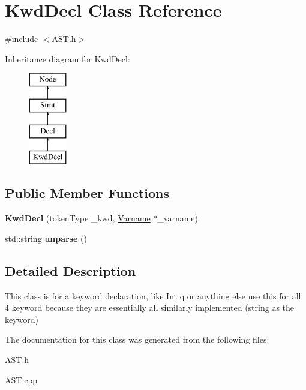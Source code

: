 \hypertarget{classKwdDecl}{\section{Kwd\-Decl Class Reference}
\label{classKwdDecl}
}


{\ttfamily \#include $<$A\-S\-T.\-h$>$}

Inheritance diagram for Kwd\-Decl\-:\begin{figure}[H]
\begin{center}
\leavevmode
\includegraphics[height=4.000000cm]{classKwdDecl}
\end{center}
\end{figure}
\subsection*{Public Member Functions}
\begin{DoxyCompactItemize}
\item 
\hypertarget{classKwdDecl_a676b9e05697b0acf311b3c57456d7304}{{\bfseries Kwd\-Decl} (token\-Type \-\_\-kwd, \hyperlink{classVarname}{Varname} $\ast$\-\_\-varname)}\label{classKwdDecl_a676b9e05697b0acf311b3c57456d7304}

\item 
\hypertarget{classKwdDecl_ac5f258785ee2a869413772b32c627973}{std\-::string {\bfseries unparse} ()}\label{classKwdDecl_ac5f258785ee2a869413772b32c627973}

\end{DoxyCompactItemize}


\subsection{Detailed Description}
This class is for a keyword declaration, like Int q or anything else  use this for all 4 keyword because they are essentially all similarly implemented (string as the keyword) 

The documentation for this class was generated from the following files\-:\begin{DoxyCompactItemize}
\item 
A\-S\-T.\-h\item 
A\-S\-T.\-cpp\end{DoxyCompactItemize}
